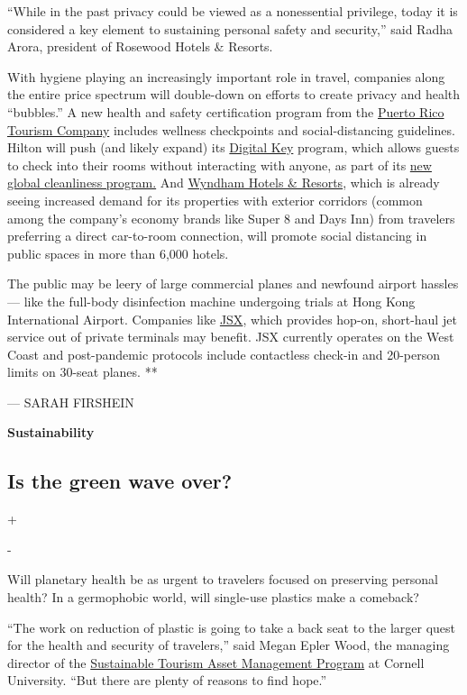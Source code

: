 ``While in the past privacy could be viewed as a nonessential privilege,
today it is considered a key element to sustaining personal safety and
security,'' said Radha Arora, president of Rosewood Hotels \& Resorts.

With hygiene playing an increasingly important role in travel, companies
along the entire price spectrum will double-down on efforts to create
privacy and health ``bubbles.'' A new health and safety certification
program from the
\href{https://www.prtourism.com/dnn/Default.aspx}{Puerto Rico Tourism
Company} includes wellness checkpoints and social-distancing guidelines.
Hilton will push (and likely expand) its
\href{https://www.hilton.com/en/corporate/coronavirus/}{Digital Key}
program, which allows guests to check into their rooms without
interacting with anyone, as part of its
\href{https://www.hilton.com/en/corporate/coronavirus/}{new global
cleanliness program.} And
\href{https://www.wyndhamhotels.com/wyndham}{Wyndham Hotels \& Resorts},
which is already seeing increased demand for its properties with
exterior corridors (common among the company's economy brands like Super
8 and Days Inn) from travelers preferring a direct car-to-room
connection, will promote social distancing in public spaces in more than
6,000 hotels.

The public may be leery of large commercial planes and newfound airport
hassles --- like the full-body disinfection machine undergoing trials at
Hong Kong International Airport. Companies like
\href{https://www.jsx.com/}{JSX}, which provides hop-on, short-haul jet
service out of private terminals may benefit. JSX currently operates on
the West Coast and post-pandemic protocols include contactless check-in
and 20-person limits on 30-seat planes. **

--- SARAH FIRSHEIN

\textbf{Sustainability}

\hypertarget{is-the-green-wave-over}{%
\subsection{Is the green wave over?}\label{is-the-green-wave-over}}

+

-

Will planetary health be as urgent to travelers focused on preserving
personal health? In a germophobic world, will single-use plastics make a
comeback?

``The work on reduction of plastic is going to take a back seat to the
larger quest for the health and security of travelers,'' said Megan
Epler Wood, the managing director of the
\href{https://www.johnson.cornell.edu/center-for-sustainable-global-enterprise/programs/sustainable-tourism-asset-management-program-stamp/}{Sustainable
Tourism Asset Management Program} at Cornell University. ``But there are
plenty of reasons to find hope.''


